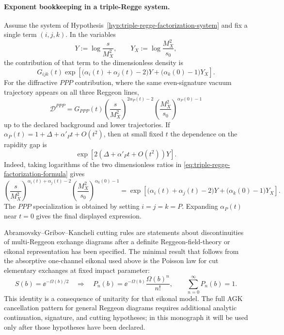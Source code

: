 \paragraph{Exponent bookkeeping in a triple-Regge system.}
Assume the system of Hypothesis~\ref{hyp:triple-regge-factorization-system} and
fix a single term \((i,j,k)\).  In the variables
\[
  Y:=\log\frac{s}{M_X^2},\qquad
  Y_X:=\log\frac{M_X^2}{s_0},
\]
the contribution of that term to the dimensionless density is
\begin{equation}
  G_{ijk}(t)
  \exp\!\left[
    \bigl(\alpha_i(t)+\alpha_j(t)-2\bigr)Y
    +\bigl(\alpha_k(0)-1\bigr)Y_X
  \right].
  \label{eq:triple-regge-rapidity-exponent-form}
\end{equation}
For the diffractive \(PPP\) contribution, where the same even-signature
vacuum trajectory appears on all three Reggeon lines,
\begin{equation}
  \mathcal D^{PPP}
  =
  G_{PPP}(t)
  \left(\frac{s}{M_X^2}\right)^{2\alpha_P(t)-2}
  \left(\frac{M_X^2}{s_0}\right)^{\alpha_P(0)-1}
  \label{eq:triple-pomeron-specialization}
\end{equation}
up to the declared background and lower trajectories.  If
\(\alpha_P(t)=1+\Delta+\alpha'_P t+O(t^2)\), then at small fixed \(t\)
the dependence on the rapidity gap is
\[
  \exp\!\left[2(\Delta+\alpha'_P t+O(t^2))Y\right].
\]
Indeed, taking logarithms of the two dimensionless ratios in
\eqref{eq:triple-regge-factorization-formula} gives
\[
  \left(\frac{s}{M_X^2}\right)^{\alpha_i(t)+\alpha_j(t)-2}
  \left(\frac{M_X^2}{s_0}\right)^{\alpha_k(0)-1}
  =
  \exp\!\left[
    \bigl(\alpha_i(t)+\alpha_j(t)-2\bigr)Y
    +\bigl(\alpha_k(0)-1\bigr)Y_X
  \right].
\]
The \(PPP\) specialization is obtained by setting \(i=j=k=P\).  Expanding
\(\alpha_P(t)\) near \(t=0\) gives the final displayed expression.

\begin{remark}
\label{rem:agk-eikonal-status}
Abramovsky--Gribov--Kancheli cutting rules are statements about
discontinuities of multi-Reggeon exchange diagrams after a definite
Reggeon-field-theory or eikonal representation has been specified.  The
minimal result that follows from the absorptive one-channel eikonal used
above is the Poisson law for cut elementary exchanges at fixed impact
parameter:
\begin{equation}
  S(b)=\ee^{-\Omega(b)/2}
  \quad\Longrightarrow\quad
  P_n(b)=\ee^{-\Omega(b)}\frac{\Omega(b)^n}{n!},
  \qquad
  \sum_{n=0}^\infty P_n(b)=1.
  \label{eq:eikonal-poisson-cut-exchanges}
\end{equation}
This identity is a consequence of unitarity for that eikonal model.  The full
AGK cancellation pattern for general Reggeon diagrams requires additional
analytic continuation, signature, and cutting hypotheses; in this monograph it
will be used only after those hypotheses have been declared.
\end{remark}

